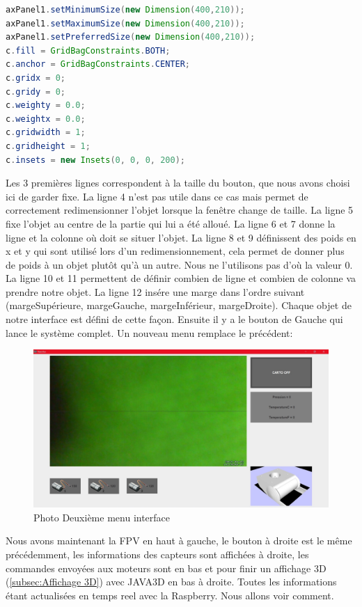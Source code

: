 \documentclass[a4paper,11pt]{report}
\begin{document}
				\begin{lstlisting}[language=java]
axPanel1.setMinimumSize(new Dimension(400,210));
axPanel1.setMaximumSize(new Dimension(400,210));
axPanel1.setPreferredSize(new Dimension(400,210));
c.fill = GridBagConstraints.BOTH;
c.anchor = GridBagConstraints.CENTER;
c.gridx = 0;
c.gridy = 0;
c.weighty = 0.0;
c.weightx = 0.0;
c.gridwidth = 1;
c.gridheight = 1;
c.insets = new Insets(0, 0, 0, 200);
				\end{lstlisting}
				Les 3 premières lignes correspondent à la taille du bouton, que nous avons choisi ici de garder fixe.
				\newline La ligne 4 n'est pas utile dans ce cas mais permet de correctement redimensionner l'objet lorsque la fenêtre change de taille.
				\newline La ligne 5 fixe l'objet au centre de la partie qui lui a été alloué.
				\newline La ligne 6 et 7 donne la ligne et la colonne où doit se situer l'objet.
				\newline La ligne 8 et 9 définissent des poids en x et y qui sont utilisé lors d'un redimensionnement, cela permet de donner plus de poids à un objet plutôt qu'à un autre. Nous ne l'utilisons pas d'où la valeur 0.
				\newline La ligne 10 et 11 permettent de définir combien de ligne et combien de colonne va prendre notre objet.
				\newline La ligne 12 insére une marge dans l'ordre suivant (margeSupérieure, margeGauche, margeInférieur, margeDroite).
				\newline Chaque objet de notre interface est défini de cette façon.
				\newline Ensuite il y a le bouton de Gauche qui lance le système complet. Un nouveau menu remplace le précédent:
				\begin{figure}[!h]
					\begin{center}
						\includegraphics[scale=0.15]{Photos/Interface2.png}
						\caption{Photo Deuxième menu interface}
					\end{center}
				\end{figure}
				\newline Nous avons maintenant la FPV en haut à gauche, le bouton à droite est le même précédemment, les informations des capteurs sont affichées à droite, les commandes envoyées aux moteurs sont en bas et pour finir un affichage 3D (\ref{subsec:Affichage 3D}) avec JAVA3D en bas à droite. Toutes les informations étant actualisées en temps reel avec la Raspberry. Nous allons voir comment.
				
\end{document}
